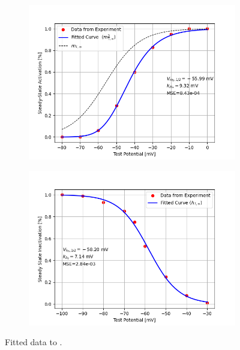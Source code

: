 \documentclass[../../workflow.tex]{subfiles}
\begin{document}
\begin{figure}[htbp]
    \centering
    \begin{subfigure}[t]{0.45\textwidth}
        \centering
        \includegraphics[width=\textwidth]{./img/t_type_calcium_channel/3_fitted_steady_state_activation.png}
    \end{subfigure}
    \hfill
    \begin{subfigure}[t]{0.45\textwidth}
        \centering
        \includegraphics[width=\textwidth]{./img/t_type_calcium_channel/5_fitted_steady_state_inactivation.png}
    \end{subfigure}
    
    \caption{Fitted data to \parencite{jeongCaa1TFlyTtype2015}.}
    \label{fig:data_steady_state_from_jeong}
\end{figure}
\end{document}
